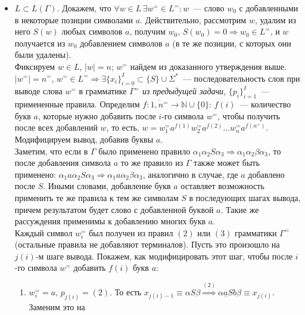 \documentclass[a4paper]{article}
\begin{document}
{\begin{itemize}
\begin{enumerate}[1.]
\end{enumerate}
Получаем $P(I)\Rightarrow S(w)\equiv S(w_I)\geqslant 0\Rightarrow w\in L$.
\item $L\subset L(\Gamma)$. Докажем, что $\forall w\in L\,\exists w^=\in L^=\colon w$~--- слово $w_0$ с добавленными в некоторые позиции символами $a$. Действительно, рассмотрим $w$, удалим из него $S(w)$ любых символов $a$, получим $w_0$, $S(w_0)=0\Rightarrow w_0\in L^=$, и $w$ получается из $w_0$ добавлением символов $a$ (в те же позиции, с которых они были удалены).
\\[5pt]
\def\neqv{n^=}
\def\weqv{w^=}
\def\ieq{^=}
Фиксируем $w\in L$, $|w|=n$; $w^=$ найдем из доказанного утверждения выше. $|w^=|=\neqv$, $w^=\in L^=\Rightarrow \exists \{x_i\}^I_{i=0}\subset\{S\}\cup \Sigma^*$~--- последовательность слов при выводе слова $w^=$ в грамматике $\Gamma^=$ {\em из предыдущей задачи}, $\{p_i\}_{i=1}^I$~--- примененные правила.\newline
Определим $f\colon \overline{1,\neqv}\longrightarrow {\mathbb N}\cup\{0\}$: $f(i)$~--- количество букв $a$, которые нужно добавить после $i$-го символа $\weqv$, чтобы получить после всех добавлений $w$, то есть, $w=\weqv_1a^{f(1)}\weqv_2a^{f(2)}...\weqv_na^{f(\neqv)}$.
\\[5pt]
Модифицируем вывод, добавив буквы $a$.
\\[5pt]
Заметим, что если в $\Gamma$ было применено правило $\alpha_1\alpha_2S\alpha_3\Longrightarrow\alpha_1\alpha_2\beta\alpha_3$, то после добавления символа $a$ то же правило из $\Gamma$ также может быть применено: $\alpha_1a\alpha_2S\alpha_3\Longrightarrow\alpha_1a\alpha_2\beta\alpha_3$, аналогично в случае, где $a$ добавлено после $S$. Иными словами, добавление букв $a$ оставляет возможность применить те же правила к тем же символам $S$ в последующих шагах вывода, причем результатом будет слово с добавленной буквой $a$. Такие же рассуждения применимы к добавлению многих букв $a$.
\\[5pt]
Каждый символ $\weqv_i$ был получен из правил $(2)$ или $(3)$ грамматики $\Gamma\ieq$ (остальные правила не добавляют терминалов). Пусть это произошло на $j(i)$-м шаге вывода. Покажем, как модифицировать этот шаг, чтобы после $i$-го символа $\weqv$ добавить $f(i)$ букв $a$:\begin{enumerate}
\item $\weqv_i=a,\,p_{j(i)}=(2)$. То есть $x_{j(i)-1}\equiv\alpha S\beta\overset{(2)}{\Longrightarrow}\alpha \underline{a}Sb\beta\equiv x_{j(i)}$. Заменим это на\newline

\end{enumerate}
\end{itemize}}
\end{document}
